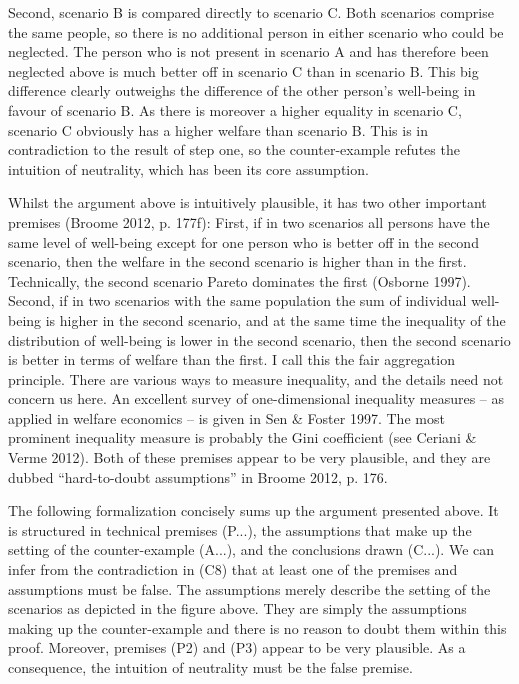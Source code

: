 Second, scenario B is compared directly to scenario C. Both scenarios comprise the same people, so there is no additional person in either scenario who could be neglected. The person who is not present in scenario A and has therefore been neglected above is much better off in scenario C than in scenario B. This big difference clearly outweighs the difference of the other person’s well-being in favour of scenario B. As there is moreover a higher equality in scenario C, scenario C obviously has a higher welfare than scenario B. This is in contradiction to the result of step one, so the counter-example refutes the intuition of neutrality, which has been its core assumption.  

Whilst the argument above is intuitively plausible, it has two other important premises (\label{ref:RNDcNWwD0bGcJ}Broome 2012, p. 177f): First, if in two scenarios all persons have the same level of well-being except for one person who is better off in the second scenario, then the welfare in the second scenario is higher than in the first. Technically, the second scenario Pareto dominates the first (\label{ref:RNDe8Jgwq2mlh}Osborne 1997). Second, if in two scenarios with the same population the sum of individual well-being is higher in the second scenario, and at the same time the inequality of the distribution of well-being is lower in the second scenario, then the second scenario is better in terms of welfare than the first. I call this the fair aggregation principle. There are various ways to measure inequality, and the details need not concern us here. An excellent survey of one-dimensional inequality measures – as applied in welfare economics – is given in \label{ref:RNDgO1lcEIWbu}Sen \& Foster 1997. The most prominent inequality measure is probably the Gini coefficient (see \label{ref:RNDJkmhvOr2SL}Ceriani \& Verme 2012). Both of these premises appear to be very plausible, and they are dubbed “hard-to-doubt assumptions” in \label{ref:RNDUBSa4lnZMJ}Broome 2012, p. 176.  

The following formalization concisely sums up the argument presented above. It is structured in technical premises (P...), the assumptions that make up the setting of the counter-example (A...), and the conclusions drawn (C...). We can infer from the contradiction in (C8) that at least one of the premises and assumptions must be false. The assumptions merely describe the setting of the scenarios as depicted in the figure above. They are simply the assumptions making up the counter-example and there is no reason to doubt them within this proof. Moreover, premises (P2) and (P3) appear to be very plausible. As a consequence, the intuition of neutrality must be the false premise.  

